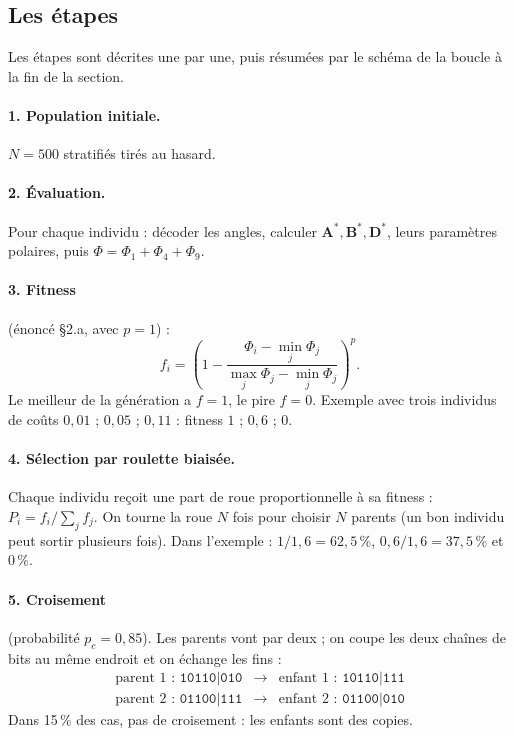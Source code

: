 \documentclass[11pt,a4paper]{article}
\newcommand{\As}{\mathbf{A}^{*}}
\newcommand{\Bs}{\mathbf{B}^{*}}
\newcommand{\Ds}{\mathbf{D}^{*}}
\begin{document}
\subsection{Les étapes}
Les étapes sont décrites une par une, puis résumées par le schéma de la
boucle à la fin de la section.

\paragraph{1. Population initiale.} $N = 500$ stratifiés tirés au hasard.

\paragraph{2. Évaluation.} Pour chaque individu : décoder les angles,
calculer $\As, \Bs, \Ds$, leurs paramètres polaires, puis
$\Phi = \Phi_1 + \Phi_4 + \Phi_9$.

\paragraph{3. Fitness} (énoncé §2.a, avec $p = 1$) :
\[
f_i = \left(1 - \frac{\Phi_i - \min_j \Phi_j}{\max_j \Phi_j - \min_j \Phi_j}\right)^{p}.
\]
Le meilleur de la génération a $f = 1$, le pire $f = 0$. Exemple avec trois
individus de coûts $0{,}01$ ; $0{,}05$ ; $0{,}11$ : fitness $1$ ; $0{,}6$ ;
$0$.

\paragraph{4. Sélection par roulette biaisée.} Chaque individu reçoit une
part de roue proportionnelle à sa fitness :
$P_i = f_i / \sum_j f_j$. On tourne la roue $N$ fois pour choisir $N$
parents (un bon individu peut sortir plusieurs fois). Dans l'exemple :
$1/1{,}6 = 62{,}5\,\%$, $0{,}6/1{,}6 = 37{,}5\,\%$ et $0\,\%$.

\paragraph{5. Croisement} (probabilité $p_c = 0{,}85$). Les parents vont par
deux ; on coupe les deux chaînes de bits au même endroit et on échange les
fins :
\[
\begin{array}{lcl}
\text{parent 1 : } \texttt{10110|010} & \longrightarrow & \text{enfant 1 : } \texttt{10110|111}\\
\text{parent 2 : } \texttt{01100|111} & \longrightarrow & \text{enfant 2 : } \texttt{01100|010}
\end{array}
\]
Dans 15\,\% des cas, pas de croisement : les enfants sont des copies.
\end{document}
